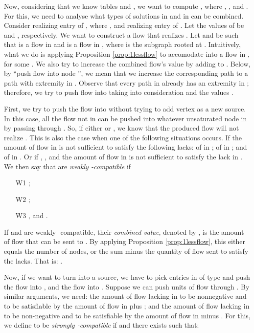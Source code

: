 \documentclass{llncs}
\begin{document}
Now, considering that we know tables  and , we want to compute , where , , and . For this, we need to analyse what types of solutions in  and in  can be combined. Consider  realizing entry  of , where , and  realizing entry  of . Let the values of  be  and , respectively. We want to construct a flow  that realizes . 
Let  and  be such that  is a flow in  and  is a flow in , where  is the subgraph rooted at . Intuitively, what we do is applying Proposition \ref{prop:1lessflow} to accomodate  into a flow in , for some . We also try to increase the combined flow's value by adding  to . Below, by ``push flow into node '', we mean that we increase the corresponding path to a path with extremity in . Observe that every path in  already has an extremity in ; therefore, we try to push flow  into  taking into consideration  and the values .


First, we try to push the flow  into  without trying to add vertex  as a new source. In this case, all the flow not in  can be pushed into whatever unsaturated node in  by passing through . So, if either  or , we know that the produced flow will not realize . This is also the case when one of the following situations occurs. If the amount of flow in  is not sufficient to satisfy the following lacks: of  in ; of  in ; and of  in . Or if , , and the amount of flow  in  is not sufficient to satisfy the lack in . We then say that  are \emph{weakly -compatible} if 

\begin{itemize}
  \item[W1] ; \item[W2] ; \item[W3] , and . \end{itemize}



If  and  are weakly -compatible, their \emph{combined value}, denoted by , is the amount of flow that can be sent to . By applying Proposition \ref{prop:1lessflow}, this either equals the number of nodes, or the sum  minus the quantity of flow sent to satisfy the lacks. That is: . 

Now, if we want to turn  into a source, we have to pick entries in  of type  and push the flow  into , and the flow  into . Suppose we can push  units of flow through . By similar arguments, we need: the amount of flow lacking in  to be nonnegative and to be satisfiable by the amount of flow in  plus ; and the amount of flow lacking in  to be non-negative and to be satisfiable by the amount of flow in  minus . For this, we define  to be \emph{strongly -compatible} if  and there exists  such that:
\end{document}
